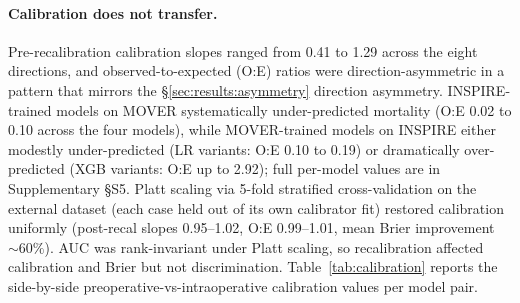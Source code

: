 \paragraph{Calibration does not transfer.} Pre-recalibration calibration slopes ranged from 0.41 to 1.29 across the eight directions, and observed-to-expected (O:E) ratios were direction-asymmetric in a pattern that mirrors the §\ref{sec:results:asymmetry} direction asymmetry. INSPIRE-trained models on MOVER systematically under-predicted mortality (O:E 0.02 to 0.10 across the four models), while MOVER-trained models on INSPIRE either modestly under-predicted (LR variants: O:E 0.10 to 0.19) or dramatically over-predicted (XGB variants: O:E up to 2.92); full per-model values are in Supplementary §S5. Platt scaling via 5-fold stratified cross-validation on the external dataset (each case held out of its own calibrator fit) restored calibration uniformly (post-recal slopes 0.95--1.02, O:E 0.99--1.01, mean Brier improvement $\sim 60\%$). AUC was rank-invariant under Platt scaling, so recalibration affected calibration and Brier but not discrimination. Table~\ref{tab:calibration} reports the side-by-side preoperative-vs-intraoperative calibration values per model pair.

